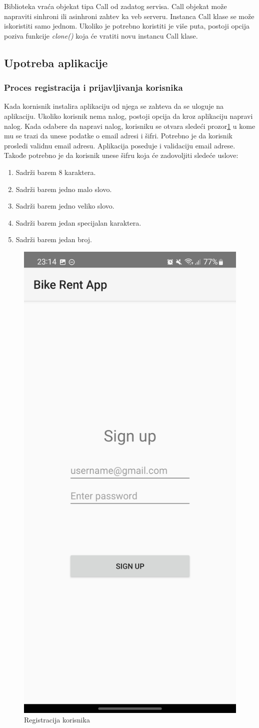 \documentclass[12pt,oneside]{memoir}
\begin{document}
Biblioteka vraća objekat tipa Call od zadatog servisa. Call objekat može napraviti sinhroni ili asinhroni zahtev ka veb serveru. Instanca Call klase se može iskoristiti samo jednom. Ukoliko je potrebno koristiti je više puta, postoji opcija poziva funkcije \emph{clone()} koja će vratiti novu instancu Call klase.
 
\subsection{Upotreba aplikacije}
 
\subsubsection{Proces registracija i prijavljivanja korisnika}
 
Kada kornisnik instalira aplikaciju od njega se zahteva da se uloguje na aplikaciju. Ukoliko korisnik nema nalog, postoji opcija da kroz aplikaciju napravi nalog. Kada odabere da napravi nalog, korisniku se otvara sledeći prozor\ref{fig:registracijaKorisnika} u kome mu se trazi da unese podatke o email adresi i šifri. Potrebno je da korisnik prosledi validnu email adresu. Aplikacija poseduje i validaciju email adrese. Takođe potrebno je da korisnik unese šifru koja će zadovoljiti sledeće uslove:

\begin{enumerate}
  \item Sadrži barem 8 karaktera.
  \item Sadrži barem jedno malo slovo.
  \item Sadrži barem jedno veliko slovo.
  \item Sadrži barem jedan specijalan karaktera.
  \item Sadrži barem jedan broj.
\end{enumerate}
 
\begin{figure}[!ht]
  \centering
  \includegraphics[height=0.6\textwidth]{Registracija.jpg}
  \caption{Registracija korisnika}
  \label{fig:registracijaKorisnika}
\end{figure}
\end{document}
